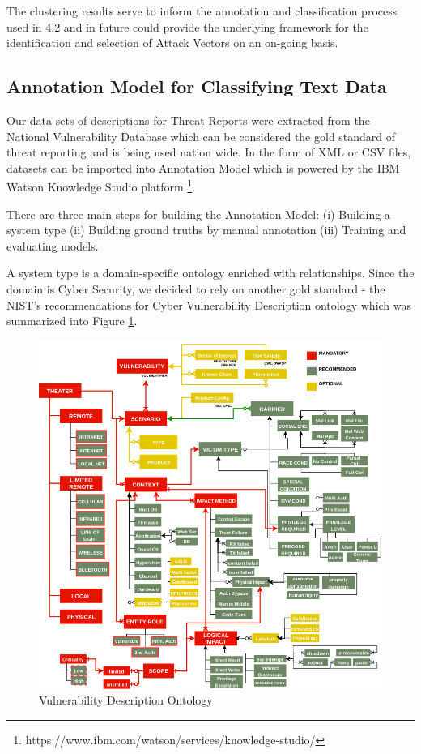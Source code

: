 \documentclass{article} %
\begin{document}
The clustering results serve to inform the annotation and classification process used in 4.2 and in future could provide the underlying framework for the identification and selection of Attack Vectors on an on-going basis.

\subsection{Annotation Model for Classifying Text Data}
Our data sets of descriptions for Threat Reports were extracted from the National Vulnerability Database which can be considered the gold standard of threat reporting and is being used nation wide. In the form of XML or CSV files, datasets can be imported into Annotation Model which is powered by the IBM Watson Knowledge Studio platform \footnote{https://www.ibm.com/watson/services/knowledge-studio/}.

There are three main steps for building the Annotation Model: (i) Building a system type (ii) Building ground truths by manual annotation (iii) Training and evaluating models.

A system type is a domain-specific ontology enriched with relationships. Since the domain is Cyber Security, we decided to rely on another gold standard - the NIST's recommendations for Cyber Vulnerability Description ontology \cite{Booth2016DraftOntology} which was summarized into Figure \ref{Figure:VulOntology}.

\begin{figure}[h]
  \centering
  \includegraphics[width=12cm]{images/NISTIR8138.png}
  \caption{Vulnerability Description Ontology}
  \label{Figure:VulOntology}
\end{figure}
\end{document}
